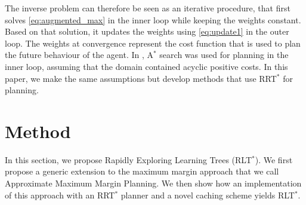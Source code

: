 \documentclass{article}  %
\begin{document}
The inverse problem can therefore be seen as an iterative procedure, that first solves \eqref{eq:augmented_max} in the inner loop while keeping the weights constant. Based on that solution, it updates the weights using \eqref{eq:update1} in the outer loop. The weights at convergence represent the cost function that is used to plan the future behaviour of the agent. In \cite{ratliff2006maximum}, A$^*$ search was used for planning in the inner loop, assuming that the domain contained acyclic positive costs. In this paper, we make the same assumptions but develop methods that use RRT$^*$ for planning.

\section{Method}
	In this section, we propose Rapidly Exploring Learning Trees (RLT$^*$).  We first propose a generic extension to the maximum margin approach that we call Approximate Maximum Margin Planning.  We then show how an implementation of this approach with an RRT$^*$ planner and a novel caching scheme yields RLT$^*$.

\end{document}
